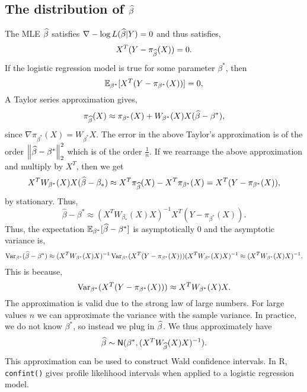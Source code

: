 \subsection{The distribution of $\widehat{\beta}$}
The MLE $\widehat{\beta}$ satisfies $\nabla -\log L(\widehat{\beta}|Y) = 0$ and thus satisfies,
\[X^T(Y-\pi_{\widehat{\beta}}(X)) = 0. \]
If the logistic regression model is true for some parameter $\beta^*$, then 
\[{\mathbb{E}}_{\beta^*}[X^T(Y-\pi_{\beta^*}(X))] =0, \]
 A Taylor series approximation gives,
\[\pi_{\widehat{\beta}}(X) \approx \pi_{\beta^*}(X) + W_{\beta^*}(X)X(\widehat{\beta}-\beta^*), \]
since $\nabla \pi_{\beta^*}(X) = W_{\beta^*}X$. The error in the above Taylor's approximation is of the order $\left\|\widehat{\beta}-\beta^*\right\|_2^2$ which is of the order $\frac{1}{n}$. If we rearrange the above approximation and multiply by $X^T$, then we get
\[X^TW_{\beta^*}(X)X(\widehat{\beta}-\beta_*) \approx X^T\pi_{\widehat{\beta}}(X)-X^T\pi_{\beta^*}(X) = X^T(Y-\pi_{\beta^*}(X)), \]
by stationary. Thus,
\[\widehat{\beta}-\beta^* \approx (X^TW_{\beta_*}(X)X)^{-1}X^T(Y-\pi_{\beta^*}(X)). \]
Thus, the expectation ${\mathbb{E}}_{\beta^*}[\widehat{\beta}-\beta^*]$ is asymptotically 0 and the asymptotic variance is,
\begin{align*}
    \operatorname{Var}_{\beta^*}(\widehat{\beta}-\beta^*) \approx (X^TW_{\beta^*}(X)X)^{-1}\operatorname{Var}_{\beta^*}(X^T(Y-\pi_{\beta^*}(X)))(X^TW_{\beta^*}(X)X)^{-1} \approx (X^TW_{\beta^*}(X)X)^{-1}.
\end{align*}
This is because,
\[\operatorname{Var}_{\beta^*}(X^T(Y-\pi_{\beta^*}(X))) \approx X^TW_{\beta^*}(X)X.\]
The approximation is valid due to the strong law of large numbers. For large values $n$ we can approximate the variance with the sample variance. In practice, we do not  know $\beta^*$, so instead we plug in $\widehat{\beta}$. We thus approximately have
\[\widehat{\beta} \sim \mathsf{N}(\beta^*, (X^TW_{\widehat{\beta}}(X)X)^{-1}). \]
This approximation can be used to construct Wald confidence intervals. In R, \texttt{confint()} gives profile likelihood intervals when applied to a logistic regression model.

